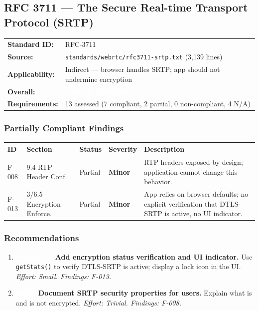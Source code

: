 \documentclass[11pt,letterpaper]{article}
\newcommand{\mostlycompliant}{\colorbox{partial}{\textcolor{white}{\textbf{\small~Mostly Compliant~}}}}
\newcommand{\sevminor}{\textcolor{minor!80!black}{\textbf{Minor}}}
\newcommand{\primedium}{\colorbox{minor!80!black}{\textcolor{white}{\small\textbf{MEDIUM}}}}
\newcommand{\prilow}{\colorbox{notapplicable}{\textcolor{white}{\small\textbf{LOW}}}}
\begin{document}
\subsection{RFC 3711 --- The Secure Real-time Transport Protocol (SRTP)}

\begin{tabular}{ll}
\textbf{Standard ID:} & RFC-3711 \\
\textbf{Source:} & \texttt{standards/webrtc/rfc3711-srtp.txt} (3,139 lines) \\
\textbf{Applicability:} & Indirect --- browser handles SRTP; app should not undermine encryption \\
\textbf{Overall:} & \mostlycompliant \\
\textbf{Requirements:} & 13 assessed (7 compliant, 2 partial, 0 non-compliant, 4 N/A) \\
\end{tabular}

\subsubsection{Partially Compliant Findings}

\begin{longtable}{C{1cm}L{2.8cm}C{1.5cm}C{1.2cm}L{6.7cm}}
\toprule
\textbf{ID} & \textbf{Section} & \textbf{Status} & \textbf{Severity} & \textbf{Description} \\
\midrule
\endhead
F-008 & 9.4 RTP Header Conf. & Partial & \sevminor & RTP headers exposed by design; application cannot change this behavior. \\
\midrule
F-013 & 3/6.5 Encryption Enforce. & Partial & \sevminor & App relies on browser defaults; no explicit verification that DTLS-SRTP is active, no UI indicator. \\
\bottomrule
\end{longtable}

\subsubsection{Recommendations}

\begin{enumerate}[leftmargin=2em]
    \item \primedium\ \textbf{Add encryption status verification and UI indicator.} Use \texttt{getStats()} to verify DTLS-SRTP is active; display a lock icon in the UI. \textit{Effort: Small. Findings: F-013.}
    \item \prilow\ \textbf{Document SRTP security properties for users.} Explain what is and is not encrypted. \textit{Effort: Trivial. Findings: F-008.}
\end{enumerate}
\end{document}
